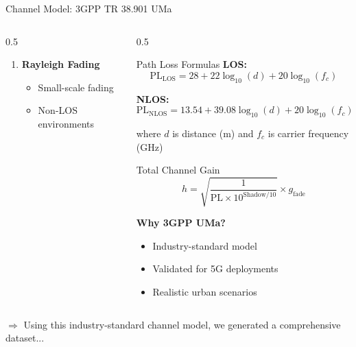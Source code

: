 \documentclass[aspectratio=169]{beamer}
\begin{document}
\begin{frame}{Channel Model: 3GPP TR 38.901 UMa}
\begin{columns}
\begin{column}{0.5\textwidth}
\begin{enumerate}
                \item \textbf{Rayleigh Fading}
                \begin{itemize}
                    \item Small-scale fading
                    \item Non-LOS environments
                \end{itemize}
            \end{enumerate}
        \end{column}
        \begin{column}{0.5\textwidth}
            \begin{block}{Path Loss Formulas}
                \small
                \textbf{LOS:}
                \begin{equation*}
                    \text{PL}_{\text{LOS}} = 28 + 22\log_{10}(d) + 20\log_{10}(f_c)
                \end{equation*}
                
                \textbf{NLOS:}
                \begin{equation*}
                    \text{PL}_{\text{NLOS}} = 13.54 + 39.08\log_{10}(d) + 20\log_{10}(f_c)
                \end{equation*}
                
                where $d$ is distance (m) and $f_c$ is carrier frequency (GHz)
            \end{block}
            
            \vspace{0.2cm}
            
            \begin{block}{Total Channel Gain}
                \begin{equation*}
                    h = \sqrt{\frac{1}{\text{PL} \times 10^{\text{Shadow}/10}}} \times g_{\text{fade}}
                \end{equation*}
            \end{block}
            
            \vspace{0.2cm}
            
            \textbf{Why 3GPP UMa?}
            \begin{itemize}
                \item Industry-standard model
                \item Validated for 5G deployments
                \item Realistic urban scenarios
            \end{itemize}
        \end{column}
    \end{columns}
    
    \vspace{0.2cm}
    \small \textcolor{iiitblue}{$\Rightarrow$ Using this industry-standard channel model, we generated a comprehensive dataset...}
\end{frame}
\end{document}
